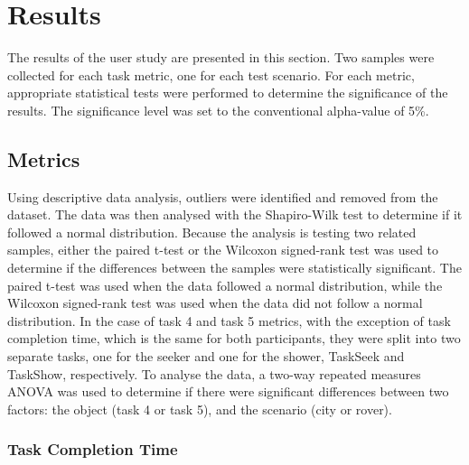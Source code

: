 \section{Results}

    The results of the user study are presented in this section. Two samples were collected for each task metric, one for each test scenario. For each metric, appropriate statistical tests were performed to determine the significance of the results. The significance level was set to the conventional alpha-value of 5\%.


    \subsection{Metrics}

        
        Using descriptive data analysis, outliers were identified and removed from the dataset. The data was then analysed with the Shapiro-Wilk \cite{shapiroAnalysisVarianceTest1965} test to determine if it followed a normal distribution. Because the analysis is testing two related samples, either the paired t-test or the Wilcoxon signed-rank test \cite{wilcoxonIndividualComparisonsRanking1945} was used to determine if the differences between the samples were statistically significant. The paired t-test was used when the data followed a normal distribution, while the Wilcoxon signed-rank test was used when the data did not follow a normal distribution. In the case of task 4 and task 5 metrics, with the exception of task completion time, which is the same for both participants, they were split into two separate tasks, one for the seeker and one for the shower, TaskSeek and TaskShow, respectively. To analyse the data, a two-way repeated measures ANOVA was used to determine if there were significant differences between two factors: the object (task 4 or task 5), and the scenario (city or rover).

        \subsubsection{Task Completion Time}


